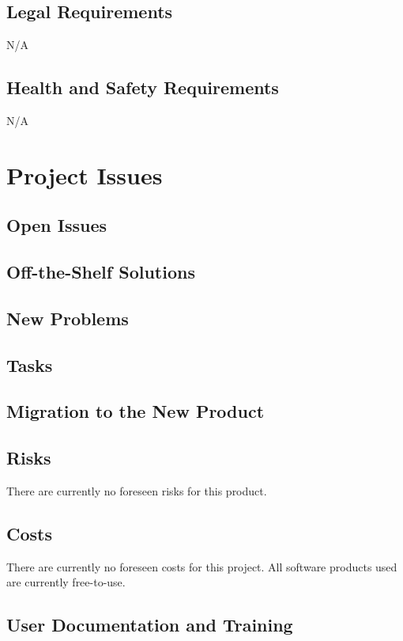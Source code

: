 \documentclass[12pt, titlepage]{article}
\begin{document}
\subsection{Legal Requirements}
N/A

\subsection{Health and Safety Requirements}
N/A

\section{Project Issues}

\subsection{Open Issues}

\subsection{Off-the-Shelf Solutions}

\subsection{New Problems}

\subsection{Tasks}

\subsection{Migration to the New Product}

\subsection{Risks}
There are currently no foreseen risks for this product.

\subsection{Costs}
There are currently no foreseen costs for this project. All software products used are currently free-to-use.

\subsection{User Documentation and Training}
\end{document}
